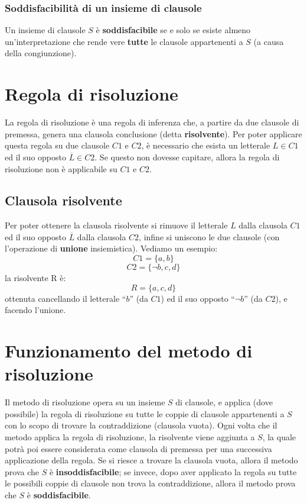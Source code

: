 \documentclass[a4paper,12pt]{report}
\begin{document}
\subsubsection{Soddisfacibilità di un insieme di clausole}
Un insieme di clausole $S$ è \textbf{soddisfacibile} se e solo se esiste almeno un'interpretazione che rende vere \textbf{tutte} le clausole appartenenti a $S$ (a causa della congiunzione).

\section{Regola di risoluzione}
La regola di risoluzione è una regola di inferenza che, a partire da due clausole di premessa, genera una clausola conclusione (detta \textbf{risolvente}). Per poter applicare questa regola su due clausole $C1$ e $C2$, è necessario che esista un letterale $L \in C1$ ed il suo opposto $\overline{L} \in C2$. Se questo non dovesse capitare, allora la regola di risoluzione non è applicabile su $C1$ e $C2$.

\subsection{Clausola risolvente}
Per poter ottenere la clausola risolvente si rimuove il letterale $L$ dalla clausola $C1$ ed il suo opposto $\overline{L}$ dalla clausola $C2$, infine si uniscono le due clausole (con l'operazione di \textbf{unione} insiemistica). Vediamo un esempio:
\[C1 = \{ a, b \}\]
\[C2 = \{ \lnot b, c, d \}\]
la risolvente R è:
\[R = \{ a, c, d \}\]
ottenuta cancellando il letterale ``$b$'' (da $C1$) ed il suo opposto ``$\lnot b$'' (da $C2$), e facendo l'unione.

\section{Funzionamento del metodo di risoluzione}
Il metodo di risoluzione opera su un insieme $S$ di clausole, e applica (dove possibile) la regola di risoluzione su tutte le coppie di clausole appartenenti a $S$ con lo scopo di trovare la contraddizione (clausola vuota). Ogni volta che il metodo applica la regola di risoluzione, la risolvente viene aggiunta a $S$, la quale potrà poi essere considerata come clausola di premessa per una successiva applicazione della regola. Se si riesce a trovare la clausola vuota, allora il metodo prova che $S$ è \textbf{insoddisfacibile}; se invece, dopo aver applicato la regola su tutte le possibili coppie di clausole non trova la contraddizione, allora il metodo prova che $S$ è \textbf{soddisfacibile}.
\end{document}
